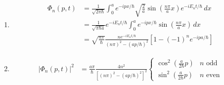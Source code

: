 \documentclass{article}
\begin{document}
\begin{enumerate}
  \item

        \begin{align*}
          \Phi_n(p, t) & = \frac{1}{\sqrt{2 \pi \hbar}} \int_0^a e^{-i p x / \hbar} \sqrt{\frac{2}{a}} \sin \left( \frac{n \pi}{a} x \right) e^{-i E_n t / \hbar} \,d x \\
                       & = \frac{1}{\sqrt{\pi \hbar a}} e^{-i E_n t / \hbar} \int_0^a e^{-i p x / \hbar} \sin \left( \frac{n \pi}{a} x \right) \,d x                    \\
                       & = \sqrt{\frac{a \pi}{\hbar}} \frac{n e^{-i E_n t / \hbar}}{(n \pi)^2 - (a p / \hbar)^2} [1 - (-1)^n e^{-i p a / \hbar}]
        \end{align*}

  \item

        \begin{align*}
          |\Phi_n(p, t)|^2 & = \frac{a \pi}{\hbar} \frac{4 n^2}{[(n \pi)^2 - (a p / \hbar)^2]^2} \begin{cases}
                                                                                                   \cos^2 \left( \frac{a}{2 \hbar} p \right) & n \text{ odd}  \\
                                                                                                   \sin^2 \left( \frac{a}{2 \hbar} p \right) & n \text{ even}
                                                                                                 \end{cases}
        \end{align*}
\end{enumerate}

\subsection{}
\end{document}
